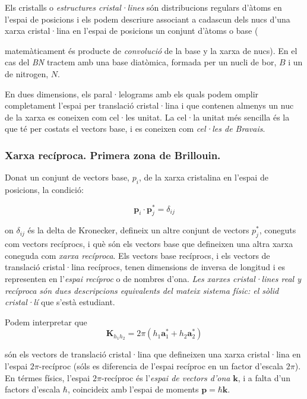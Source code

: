 \documentclass[12pt]{article} %
\let\vec\mathbf %
\begin{document}
Els cristalls o \emph{estructures cristal·lines} són distribucions regulars d'àtoms en l'espai de posicions i els podem descriure associant a cadascun dels nucs d'una xarxa cristal·lina en l'espai de posicions un conjunt d'àtoms o base ({matemàticament és producte de \emph{convolució} de la base y la xarxa de nucs). En el cas del \emph{BN} tractem amb una base diatòmica, formada per un nucli de bor, $B$ i un de nitrogen, $N$. 

En dues dimensions, els paral·lelograms amb els quals podem omplir completament l'espai per translació cristal·lina i que contenen almenys un nuc de la xarxa es coneixen com cel·les unitat. La cel·la unitat més sencilla és la que té per costats el vectors base, i es coneixen com \emph{cel·les de Bravais}.

\subsubsection{Xarxa recíproca. Primera zona de Brillouin.}
Donat un conjunt de vectors base, $p_i$, de la xarxa cristalina en l'espai de posicions, la condició:

\begin{equation}
\label{eq:rec1}
\vec p_i\cdot\vec p_j^{*}=\delta_{ij}
\end{equation}

on $\delta_{ij}$ és la delta de Kronecker, defineix un altre conjunt de vectors $p_j^*$, coneguts com vectors recíprocs, i què són els vectors base que defineixen una altra xarxa coneguda com \textit{xarxa recíproca}. Els  vectors base recíprocs, i els vectors de translació cristal·lina recíprocs, tenen dimensions de inversa de longitud i es representen en l'\textit{espai recíproc} o de nombres d'ona. \textit{Les xarxes cristal·lines real y recíproca són dues descripcions equivalents del mateix sistema físic: el sòlid cristal·lí} que s'està estudiant.

Podem interpretar que
\begin{equation}
\label{eq:rec3}
\vec K_{h_1h_2}=2\pi\left(h_1\vec a_1^{*}+h_2\vec a_2^{*}\right)
\end{equation}

són els vectors de translació cristal·lina que defineixen una xarxa cristal·lina en l'espai $2\pi$-recíproc (sóls es diferencia de l'espai recíproc en un factor d'escala $2\pi$). En térmes físics, l'espai $2\pi$-recíproc és l'\emph{espai de vectors d'ona} $\vec k$, i a falta d'un factors d'escala $\hbar$, coincideix amb l'espai de moments  $\vec p=\hbar\vec k$.

}
\end{document}
